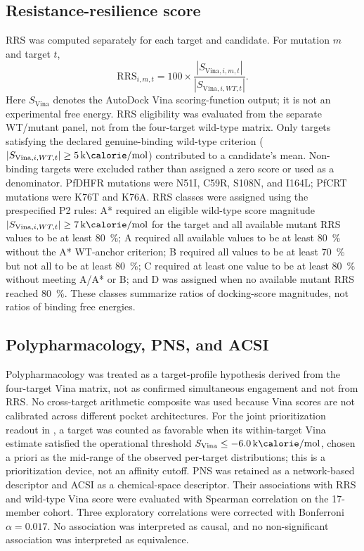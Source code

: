 \documentclass[journal=jcisd8,manuscript=article]{achemso}
\begin{document}
\subsection{Resistance-resilience score}
RRS was computed separately for each target and candidate. For mutation $m$ and target $t$,
\begin{equation}
\mathrm{RRS}_{i,m,t}=100\times\frac{|S_{\mathrm{Vina},i,m,t}|}{|S_{\mathrm{Vina},i,WT,t}|}.
\label{eq:rrs}
\end{equation}
Here $S_{\mathrm{Vina}}$ denotes the AutoDock Vina scoring-function output; it is not an experimental free energy. RRS eligibility was evaluated from the separate WT/mutant panel, not from the four-target wild-type matrix. Only targets satisfying the declared genuine-binding wild-type criterion ($|S_{\mathrm{Vina},i,WT,t}|\geq\qty{5}{\kilo\calorie\per\mole}$) contributed to a candidate's mean. Non-binding targets were excluded rather than assigned a zero score or used as a denominator. PfDHFR mutations were N51I, C59R, S108N, and I164L; PfCRT mutations were K76T and K76A. RRS classes were assigned using the prespecified P2 rules: A* required an eligible wild-type score magnitude $|S_{\mathrm{Vina},i,WT,t}|\geq\qty{7}{\kilo\calorie\per\mole}$ for the target and all available mutant RRS values to be at least \qty{80}{\percent}; A required all available values to be at least \qty{80}{\percent} without the A* WT-anchor criterion; B required all values to be at least \qty{70}{\percent} but not all to be at least \qty{80}{\percent}; C required at least one value to be at least \qty{80}{\percent} without meeting A/A* or B; and D was assigned when no available mutant RRS reached \qty{80}{\percent}. These classes summarize ratios of docking-score magnitudes, not ratios of binding free energies.

\subsection{Polypharmacology, PNS, and ACSI}
Polypharmacology was treated as a target-profile hypothesis derived from the four-target Vina matrix, not as confirmed simultaneous engagement and not from RRS. No cross-target arithmetic composite was used because Vina scores are not calibrated across different pocket architectures. For the joint prioritization readout in , a target was counted as favorable when its within-target Vina estimate satisfied the operational threshold $S_{\mathrm{Vina}}\leq\qty{-6.0}{\kilo\calorie\per\mole}$, chosen a priori as the mid-range of the observed per-target distributions; this is a prioritization device, not an affinity cutoff. PNS was retained as a network-based descriptor and ACSI as a chemical-space descriptor. Their associations with RRS and wild-type Vina score were evaluated with Spearman correlation on the 17-member cohort. Three exploratory correlations were corrected with Bonferroni $\alpha=\num{0.017}$. No association was interpreted as causal, and no non-significant association was interpreted as equivalence.
\end{document}

